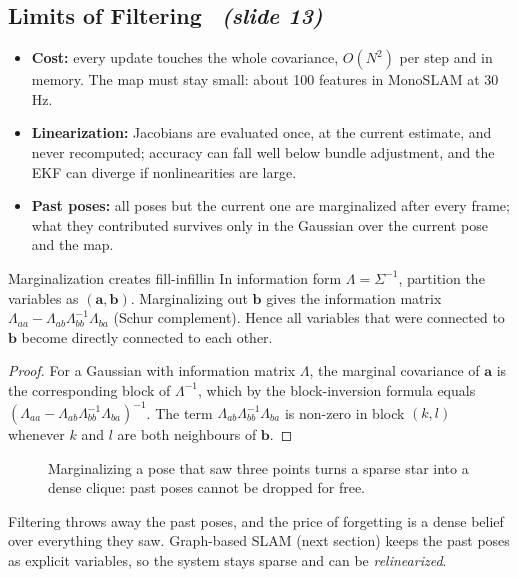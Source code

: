 \documentclass[11pt,a4paper]{article}
\newcommand{\slrs}[1]{\texorpdfstring{\ \emph{(slide #1)}}{ (slide #1)}}
\newcommand{\bx}{\mathbf{x}}
\newcommand{\by}{\mathbf{y}}
\begin{document}
\subsection{Limits of Filtering \slrs{13}}
\begin{itemize}[nosep]
\item \textbf{Cost:} every update touches the whole covariance, $O(N^2)$ per step and in memory. The map must stay small: about 100 features in MonoSLAM at 30\,Hz.
\item \textbf{Linearization:} Jacobians are evaluated once, at the current estimate, and never recomputed; accuracy can fall well below bundle adjustment, and the EKF can diverge if nonlinearities are large.
\item \textbf{Past poses:} all poses but the current one are marginalized after every frame; what they contributed survives only in the Gaussian over the current pose and the map.
\end{itemize}

\begin{proposition}{Marginalization creates fill-in}{fillin}
In information form $\Lambda=\Sigma^{-1}$, partition the variables as $(\mathbf a,\mathbf b)$. Marginalizing out $\mathbf b$ gives the information matrix $\Lambda_{aa}-\Lambda_{ab}\Lambda_{bb}^{-1}\Lambda_{ba}$ (Schur complement). Hence all variables that were connected to $\mathbf b$ become directly connected to each other.
\end{proposition}
\begin{proof}
For a Gaussian with information matrix $\Lambda$, the marginal covariance of $\mathbf a$ is the corresponding block of $\Lambda^{-1}$, which by the block-inversion formula equals $(\Lambda_{aa}-\Lambda_{ab}\Lambda_{bb}^{-1}\Lambda_{ba})^{-1}$. The term $\Lambda_{ab}\Lambda_{bb}^{-1}\Lambda_{ba}$ is non-zero in block $(k,l)$ whenever $k$ and $l$ are both neighbours of $\mathbf b$. \qedhere
\end{proof}
\begin{figure}[htbp]\centering
{}
\caption{Marginalizing a pose that saw three points turns a sparse star into a dense clique: past poses cannot be dropped for free.}
\end{figure}
\begin{intuition}
Filtering throws away the past poses, and the price of forgetting is a dense belief over everything they saw. Graph-based SLAM (next section) keeps the past poses as explicit variables, so the system stays sparse and can be \emph{relinearized}.
\end{intuition}
\end{document}
